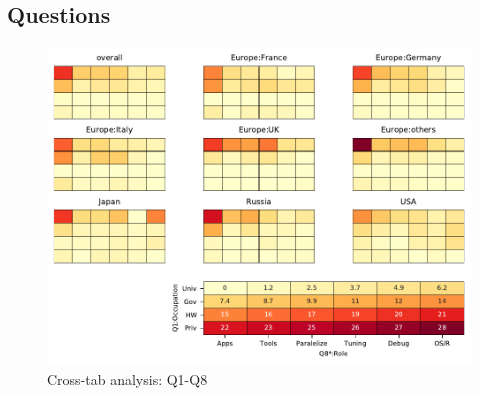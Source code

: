 
\subsection{Questions}


\begin{figure}
\begin{center}
\includegraphics[width=12cm]{../pdfs/Q1-Q8.pdf}
\caption{Cross-tab analysis: Q1-Q8}
\label{fig:Q1-Q8}
\end{center}
\end{figure}
